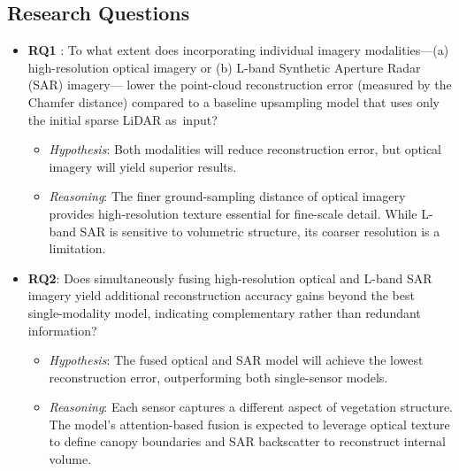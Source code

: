 \documentclass[remotesensing,article,accept,pdftex,moreauthors]{Definitions/mdpi}
\begin{document}
\subsection{Research Questions}
\begin{itemize}
  \item \textbf{RQ1}%
: To what extent does incorporating individual imagery modalities---(a) high-resolution optical imagery or (b) L-band Synthetic Aperture Radar (SAR) imagery---%
lower the point-cloud reconstruction error (measured by the Chamfer distance) compared to a baseline upsampling model that uses only the initial sparse LiDAR \mbox{as input}?
        \begin{itemize}
          \item \textit{Hypothesis}: Both modalities will reduce reconstruction error, but optical imagery will yield superior results.
          \item \textit{Reasoning}: The finer ground-sampling distance of optical imagery provides high-resolution texture essential for fine-scale detail. While L-band SAR is sensitive to volumetric structure, its coarser resolution is a limitation.
        \end{itemize}

  \item \textbf{RQ2}: Does simultaneously fusing high-resolution optical and L-band SAR imagery yield additional reconstruction accuracy gains beyond the best single-modality model, indicating complementary rather than redundant information?
        \begin{itemize}
          \item \textit{Hypothesis}: The fused optical and SAR model will achieve the lowest reconstruction error, outperforming both single-sensor models.
          \item \textit{Reasoning}: Each sensor captures a different aspect of vegetation structure. The model's attention-based fusion is expected to leverage optical texture to define canopy boundaries and SAR backscatter to reconstruct internal volume.
        \end{itemize}


\end{itemize}
\end{document}
